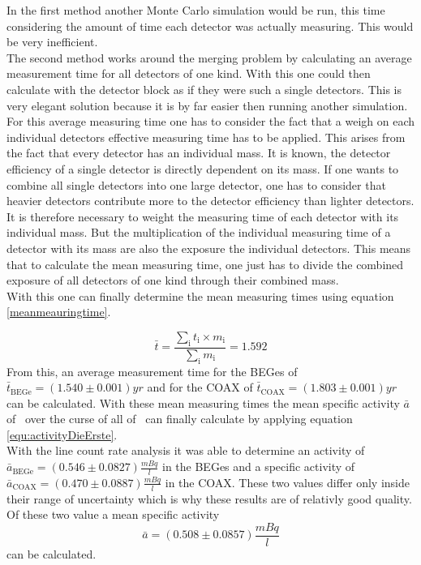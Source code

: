 \documentclass[encoding=utf8,british]{tumphthesis}
\begin{document}
In the first method another Monte Carlo simulation would be run, this time considering the amount of time each detector was actually measuring.
This would be very inefficient.
\\

The second method works around the merging problem by calculating an average measurement time for all detectors of one kind.
With this one could then calculate with the detector block as if they were such a single detectors.
This is very elegant solution because it is by far easier then running another simulation.
\\

For this average measuring time one has to consider the fact that a weigh on each individual detectors effective measuring time has to be applied.
This arises from the fact that every detector has an individual mass.
It is known, the detector efficiency of a single detector is directly dependent on its mass.
If one wants to combine all single detectors into one large detector, one has to consider that heavier detectors contribute more to the detector efficiency than lighter detectors.
It is therefore necessary to weight the measuring time of each detector with its individual mass.
But the multiplication of the individual measuring time of a detector with its mass are also the exposure the individual detectors.
This means that to calculate the mean measuring time, one just has to divide the combined exposure of all detectors of one kind through their combined mass.
\\

With this one can finally determine the mean measuring times using equation \ref{meanmeauringtime}.

\begin{equation*}
    \bar{t} = \frac{\sum_\mathrm{i} t_\mathrm{i} \times m_\mathrm{i}}{\sum_\mathrm{i} m_\mathrm{i}} = 1.592
\label{meanmeauringtime}
\end{equation*}
From this, an average measurement time for the BEGes of $\bar{t}_{\mathrm{BEGe}} = (1.540\pm0.001)\unit{yr}$ and for the COAX of $\bar{t}_{\mathrm{COAX}} = (1.803\pm0.001)\unit{yr}$ can be calculated.
With these mean measuring times the mean specific activity $\bar{a}$ of \Kr\ over the curse of all of \PII\ can  finally calculate  by applying equation \ref{equ:activityDieErste}.
\\

With the line count rate analysis it was able to determine an activity of $\bar{a}_{\mathrm{BEGe}} = (0.546\pm0.0827)	\frac{\unit{mBq}}{\unit{l}}$ in the BEGes and a specific activity of $\bar{a}_{\mathrm{COAX}} = (0.470\pm0.0887)	\frac{\unit{mBq}}{\unit{l}}$ in the COAX.
These two values differ only inside their range of uncertainty which is why these results are of relativly good quality.
Of these two value a mean specific activity 
\begin{equation*}
\bar{a} = (0.508\pm0.0857)\frac{\unit{mBq}}{\unit{l}}
\end{equation*}
can be calculated.
\\
\end{document}
